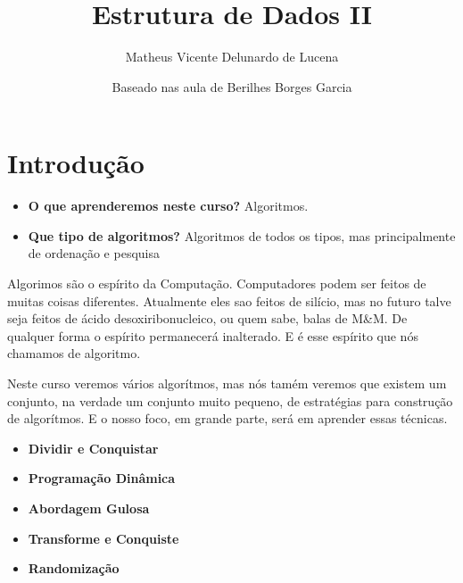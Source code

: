 \documentclass{article}
\begin{document}
    
    \title{Estrutura de Dados II}
    \author{Matheus Vicente Delunardo de Lucena\\
    \and
    Baseado nas aula de Berilhes Borges Garcia}
    \date{}
    
    
    
    \maketitle
    
    
    
    
    
    \section{Introdução}
    
    \begin{itemize}
    \item \textbf{O que aprenderemos neste curso?} \textnormal{Algoritmos.} 
    \item \textbf{Que tipo de algoritmos?} \textnormal{Algoritmos de todos os tipos, mas principalmente de ordenação e pesquisa} 
    \end{itemize}
    
    \textnormal{Algorimos são o espírito da Computação. Computadores podem ser feitos de muitas coisas diferentes. Atualmente eles sao feitos de silício, mas no futuro talve seja feitos de ácido desoxiribonucleico, ou quem sabe, balas de M\&M. De qualquer forma o espírito permanecerá inalterado. E é esse espírito que nós chamamos de algoritmo.}
    
    \textnormal{Neste curso veremos vários algorítmos, mas nós tamém veremos que existem um conjunto, na verdade um conjunto muito pequeno, de estratégias para construção de algorítmos. E o nosso foco, em grande parte, será em aprender essas técnicas.}
    
    
    \begin{itemize}
    \item \textbf{Dividir e Conquistar}
    \item \textbf{Programação Dinâmica}
    \item \textbf{Abordagem Gulosa}
    \item \textbf{Transforme e Conquiste}
    \item \textbf{Randomização}
    
    \end {itemize}
    
\end{document}
